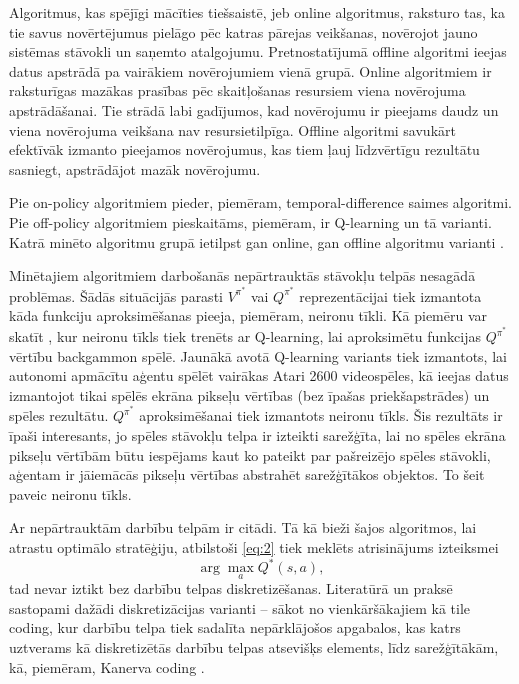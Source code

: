 \documentclass{ludis} %
\begin{document}
Algoritmus, kas spējīgi mācīties tiešsaistē, jeb online algoritmus, raksturo tas, ka tie savus novērtējumus pielāgo pēc katras pārejas veikšanas, novērojot jauno sistēmas stāvokli un saņemto atalgojumu.
Pretnostatījumā offline algoritmi ieejas datus apstrādā pa vairākiem novērojumiem vienā grupā.
Online algoritmiem ir raksturīgas mazākas prasības pēc skaitļošanas resursiem viena novērojuma apstrādāšanai. Tie strādā labi gadījumos, kad novērojumu ir pieejams daudz un viena novērojuma veikšana nav resursietilpīga.
Offline algoritmi savukārt efektīvāk izmanto pieejamos novērojumus, kas tiem ļauj līdzvērtīgu rezultātu sasniegt, apstrādājot mazāk novērojumu.

Pie on-policy algoritmiem pieder, piemēram, temporal-difference saimes algoritmi. Pie off-policy algoritmiem pieskaitāms, piemēram, ir Q-learning un tā varianti. Katrā minēto algoritmu grupā ietilpst gan online, gan offline algoritmu varianti \autocite{Barto}.

Minētajiem algoritmiem darbošanās nepārtrauktās stāvokļu telpās nesagādā problēmas. Šādās situācijās parasti $V^{\pi^*}$ vai $Q^{\pi^*}$ reprezentācijai tiek izmantota kāda funkciju aproksimēšanas pieeja, piemēram, neironu tīkli. Kā piemēru var skatīt \autocite{tesauro1995temporal}, kur neironu tīkls tiek trenēts ar Q-learning, lai aproksimētu funkcijas $Q^{\pi^*}$ vērtību backgammon spēlē.
Jaunākā avotā \autocite{mnih2013playing} Q-learning variants tiek izmantots, lai autonomi apmācītu aģentu spēlēt vairākas Atari 2600 videospēles, kā ieejas datus izmantojot tikai spēlēs ekrāna pikseļu vērtības (bez īpašas priekšapstrādes) un spēles rezultātu.
$Q^{\pi^*}$ aproksimēšanai tiek izmantots neironu tīkls.
Šis rezultāts ir īpaši interesants, jo spēles stāvokļu telpa ir izteikti sarežģīta, lai no spēles ekrāna pikseļu vērtībām būtu iespējams kaut ko pateikt par pašreizējo spēles stāvokli, aģentam ir jāiemācās pikseļu vērtības abstrahēt sarežģītākos objektos.
To šeit paveic neironu tīkls.

Ar nepārtrauktām darbību telpām ir citādi.
Tā kā bieži šajos algoritmos, lai atrastu optimālo stratēģiju, atbilstoši \eqref{eq:2} tiek meklēts atrisinājums izteiksmei
\[
	\arg \max_a Q^*(s, a),
\]
tad nevar iztikt bez darbību telpas diskretizēšanas.
Literatūrā un praksē sastopami dažādi diskretizācijas varianti -- sākot no vienkāršākajiem kā tile coding, kur darbību telpa tiek sadalīta nepārklājošos apgabalos, kas katrs uztverams kā diskretizētās darbību telpas atsevišķs elements, līdz sarežģītākām, kā, piemēram, Kanerva coding \autocite{Barto}.
\end{document}
